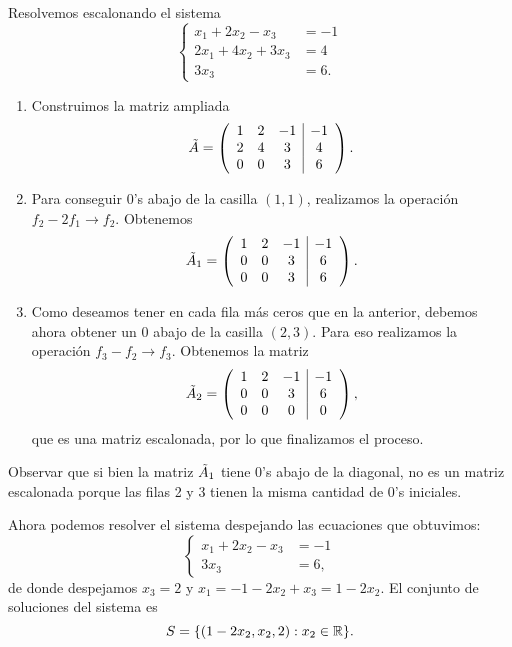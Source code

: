 \begin{ejemplo}
Resolvemos escalonando el sistema
$$
\left\{
\begin{aligned}
x_1 + 2x_2 - x_3 &= -1 \\
2x_1 + 4x_2 + 3 x_3 &= 4 \\
3 x_3 &= 6.
\end{aligned}
\right.
$$

\begin{enumerate}
\item Construimos la matriz ampliada
$$\tilde \Ab = \left( \begin{array}{ccc|c}
1 & 2 & -1 & -1 \\ 2 & 4 & 3 & 4 \\ 0 & 0 & 3 & 6 \end{array} \right).$$
\item Para conseguir 0's abajo de la casilla $(1,1)$, realizamos la operación $f_2 - 2f_1 \rightarrow f_2$.  Obtenemos
$$\tilde \Ab_1 = \left( \begin{array}{ccc|c}
1 & 2 & -1 & -1 \\ 0 & 0 & 3 & 6 \\ 0 & 0 & 3 & 6 \end{array} \right).$$

\item Como deseamos tener en cada fila m\'as ceros que en la anterior, debemos ahora obtener un 0 abajo de la casilla $(2, 3)$. Para eso realizamos la operaci\'on $f_3 - f_2 \rightarrow f_3$.  Obtenemos la matriz
$$
\tilde \Ab_2 = \left( \begin{array}{ccc|c} 1 & 2 & -1 & -1 \\ 0 & 0 & 3 & 6 \\ 0 & 0 & 0 & 0 \end{array}\right),
$$
que es una matriz escalonada, por lo que finalizamos el proceso.
\end{enumerate}

Observar que si bien la matriz $\tilde \Ab_1$ tiene 0's abajo de la diagonal, no es un matriz escalonada porque las filas 2 y 3 tienen la misma cantidad de 0's iniciales.

Ahora podemos resolver el sistema despejando las ecuaciones que obtuvimos:
$$ \left\{
\begin{aligned}
x_1 + 2 x_2 - x_3 &= -1 \\
3 x_3 &= 6,
\end{aligned}
\right.
$$
de donde despejamos $x_3 = 2$ y $x_1 = -1 - 2 x_2 + x_3 = 1-2x_2$. El conjunto de soluciones del sistema es
$$
S = \{(1-2x_2, x_2, 2): x_2 \in \mathbb R\}.
$$
\end{ejemplo}


